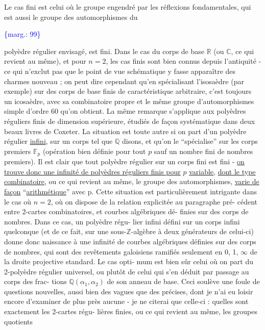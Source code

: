 \documentclass[11pt]{article}
\newcommand{\scanpage}[1]{\par\bigskip\noindent{\small\sffamily[scan #1]}\par}
\newcommand{\mspage}[1]{{\small\sffamily[p.\,#1]}}
\newcommand{\margin}[1]{\textcolor{blue}{\{\textsf{marg.:} #1\}}}
\newcommand{\uline}[1]{\underline{#1}}
\begin{document}
Le cas fini est celui où le groupe engendré par les réflexions
fondamentales, qui est aussi le groupe des automorphismes du

\margin{99}

\clearpage
\scanpage{119/100}
\mspage{22}

polyèdre régulier envisagé, est fini. Dans le cas du corps de
base $\mathbb{R}$ (ou $\mathbb{C}$, ce qui revient au même), et pour $n = 2$, les cas
finis sont bien connus depuis l'antiquité - ce qui n'exclut pas
que le point de vue schématique y fasse apparaître des charmes
nouveau ; on peut dire cependant qu'en spécialisant l'isosaèdre
(par exemple) sur des corps de base finis de caractéristique
arbitraire, c'est toujours un icosaèdre, avec sa combinatoire
propre et le même groupe d'automorphismes simple d'ordre 60 qu'on
obtient. La même remarque s'applique aux polyèdres réguliers finis
de dimension supérieure, étudiés de façon systématique dans deux
beaux livres de Coxeter. La situation est toute autre si on part
d'un polyèdre régulier \uline{infini}, sur un corps tel que $\mathbb{Q}$ disons,
et qu'on le ``spécialise'' sur les corps premiers $\mathbb{F}_p$ (opération
bien définie pour tout $p$ sauf un nombre fini de nombres premiers).
Il est clair que tout polyèdre régulier sur un corps fini est fini -
\uline{on trouve donc une infinité de polyèdres réguliers finis pour} $p$
\uline{variable}, \uline{dont le type combinatoire}, ou ce qui revient au même,
le groupe des automorphismes, \uline{varie de façon} ``\uline{arithmétique}'' avec p.
Cette situation est particulièrement intrigante  dans le cas où
$n = 2$, où on dispose de la relation explicitée au paragraphe pré-%
cédent entre 2-cartes combinatoires, et courbes algébriques dé-%
finies sur des corps de nombres. Dans ce cas, un polyèdre régu-%
lier infini défini sur un corps infini quelconque (et de ce fait,
sur une sous-$\mathbb{Z}$-algèbre à deux générateurs de celui-ci) donne donc
naissance à une infinité de courbes algébriques définies sur des
corps de nombres, qui sont des revêtements galoisiens ramifiés
seulement en 0, 1, $\infty$ de la droite projective standard. Le cas opti-%
mum est bien sûr celui où on part du 2-polyèdre régulier universel,
ou plutôt de celui qui s'en déduit par passage au corps des frac-%
tions $\mathbb{Q}(\alpha_1,\alpha_2)$ de son anneau de base. Ceci soulève une foule de
questions nouvelles, aussi bien des vagues que des précises, dont
je n'ai eu loisir encore d'examiner de plus près aucune - je ne
citerai que celle-ci : quelles sont exactement les 2-cartes régu-%
lières finies, ou ce qui revient au même, les groupes quotients
\end{document}
